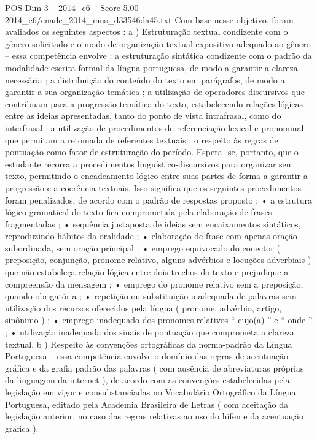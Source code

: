 \begin{textsample}{POS Dim 3 – 2014\_c6 – Score 5.00 – 2014\_c6/enade\_2014\_mus\_d33546da45.txt}
Com base nesse objetivo, foram avaliados os seguintes aspectos : a ) Estruturação textual condizente com o gênero solicitado e o modo de organização textual expositivo adequado ao gênero – essa competência envolve : a estruturação sintática condizente com o padrão da modalidade escrita formal da língua portuguesa, de modo a garantir a clareza necessária ; a distribuição do conteúdo do texto em parágrafos, de modo a garantir a sua organização temática ; a utilização de operadores discursivos que contribuam para a progressão temática do texto, estabelecendo relações lógicas entre as ideias apresentadas, tanto do ponto de vista intrafrasal, como do interfrasal ; a utilização de procedimentos de referenciação lexical e pronominal que permitam a retomada de referentes textuais ; o respeito às regras de pontuação como fator de estruturação do período.
Espera -se, portanto, que o estudante recorra a procedimentos linguístico-discursivos para organizar seu texto, permitindo o encadeamento lógico entre suas partes de forma a garantir a progressão e a coerência textuais.
Isso significa que os seguintes procedimentos foram penalizados, de acordo com o padrão de respostas proposto : • a estrutura lógico-gramatical do texto fica comprometida pela elaboração de frases fragmentadas ; • sequência justaposta de ideias sem encaixamentos sintáticos, reproduzindo hábitos da oralidade ; • elaboração de frase com apenas oração subordinada, sem oração principal ; • emprego equivocado do conector ( preposição, conjunção, pronome relativo, alguns advérbios e locuções adverbiais ) que não estabeleça relação lógica entre dois trechos do texto e prejudique a compreensão da mensagem ; • emprego do pronome relativo sem a preposição, quando obrigatória ; • repetição ou substituição inadequada de palavras sem utilização dos recursos oferecidos pela língua ( pronome, advérbio, artigo, sinônimo ) ; • emprego inadequado dos pronomes relativos “ cujo(a) ” e “ onde ” ; • utilização inadequada dos sinais de pontuação que comprometa a clareza textual. b ) Respeito às convenções ortográficas da norma-padrão da Língua Portuguesa – essa competência envolve o domínio das regras de acentuação gráfica e da grafia padrão das palavras ( com ausência de abreviaturas próprias da linguagem da internet ), de acordo com as convenções estabelecidas pela legislação em vigor e consubstanciadas no Vocabulário Ortográfico da Língua Portuguesa, editado pela Academia Brasileira de Letras ( com aceitação da legislação anterior, no caso das regras relativas ao uso do hífen e da acentuação gráfica ).

\end{textsample}
